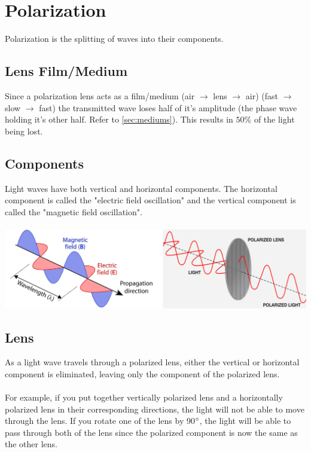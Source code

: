 \documentclass{article}
\begin{document}
\section{Polarization}
Polarization is the splitting of waves into their components.

\subsection{Lens Film/Medium}
Since a polarization lens acts as a film/medium (air $\to$ lens $\to$ air) (fast $\to$ slow $\to$ fast) the transmitted wave loses half of it's amplitude (the phase wave holding it's other half. Refer to \cref{sec:mediums}). This results in $50\%$ of the light being lost.

\subsection{Components}
Light waves have both vertical and horizontal components. The horizontal component is called the "electric field oscillation" and the vertical component is called the "magnetic field oscillation".\\\\
\includegraphics[scale=0.45]{images/polarization} \\

\vspace{4cm}

\subsection{Lens}
\noindent As a light wave travels through a polarized lens, either the vertical or horizontal component is eliminated, leaving only the component of the polarized lens.\\\\
For example, if you put together vertically polarized lens and a horizontally polarized lens in their corresponding directions, the light will not be able to move through the lens.
If you rotate one of the lens by 90$\degree$, the light will be able to pass through both of the lens since the polarized component is now the same as the other lens.
\end{document}
